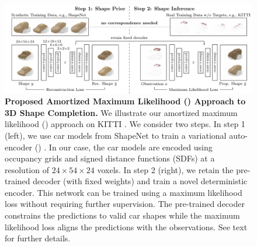 \begin{figure}[t]
    \vspace*{-0.5cm}
	\includegraphics[width=\linewidth]{fig/overview_large}
	\centering
    \caption{{\bf Proposed Amortized Maximum Likelihood (\AML) Approach to 3D Shape Completion.} We illustrate our amortized maximum likelihood (\AML) approach on KITTI \cite{Geiger2012CVPR}. We consider two steps. In step 1 (left), we use car models from ShapeNet \cite{Chang2015ARXIV} to train a variational auto-encoder (\VAE) \cite{Kingma2013ARXIV}. In our case, the car models are encoded using occupancy grids and signed distance functions (SDFs) at a resolution of $24 \times 54 \times 24$ voxels. In step 2 (right), we retain the pre-trained decoder (with fixed weights) and train a novel deterministic encoder. This network can be trained using a maximum likelihood loss without requiring further supervision. The pre-trained decoder constrains the predictions to valid car shapes while the maximum likelihood loss aligns the predictions with the observations. See text for further details.}
    \label{fig:method}
    \vspace*{-0.25cm}
\end{figure}
%

